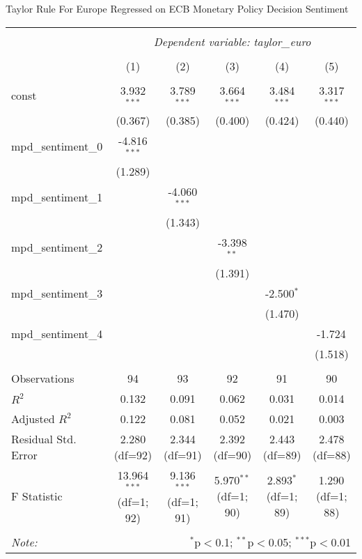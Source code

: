 \documentclass[12pt, letterpaper]{article}
\begin{document}
Taylor Rule For Europe Regressed on ECB Monetary Policy Decision Sentiment

\begin{table}[H]
\begin{adjustbox}{width=\textwidth}
\centering
\begin{tabular}{@{}lccccc@{}}
\\[-1.8ex]\hline
\hline \\[-1.8ex]
& \multicolumn{5}{c}{\textit{Dependent variable: taylor\_euro}} \\
\cline{2-6}
\\[-1.8ex] & (1) & (2) & (3) & (4) & (5) \\
\hline \\[-1.8ex]
const & 3.932$^{***}$ & 3.789$^{***}$ & 3.664$^{***}$ & 3.484$^{***}$ & 3.317$^{***}$ \\
& (0.367) & (0.385) & (0.400) & (0.424) & (0.440) \\
mpd\_sentiment\_0 & -4.816$^{***}$ & & & & \\
& (1.289) & & & & \\
mpd\_sentiment\_1 & & -4.060$^{***}$ & & & \\
& & (1.343) & & & \\
mpd\_sentiment\_2 & & & -3.398$^{**}$ & & \\
& & & (1.391) & & \\
mpd\_sentiment\_3 & & & & -2.500$^{*}$ & \\
& & & & (1.470) & \\
mpd\_sentiment\_4 & & & & & -1.724$^{}$ \\
& & & & & (1.518) \\
\hline \\[-1.8ex]
Observations & 94 & 93 & 92 & 91 & 90 \\
$R^2$ & 0.132 & 0.091 & 0.062 & 0.031 & 0.014 \\
Adjusted $R^2$ & 0.122 & 0.081 & 0.052 & 0.021 & 0.003 \\
Residual Std. Error & 2.280 (df=92) & 2.344 (df=91) & 2.392 (df=90) & 2.443 (df=89) & 2.478 (df=88) \\
F Statistic & 13.964$^{***}$ (df=1; 92) & 9.136$^{***}$ (df=1; 91) & 5.970$^{**}$ (df=1; 90) & 2.893$^{*}$ (df=1; 89) & 1.290$^{}$ (df=1; 88) \\
\hline
\hline \\[-1.8ex]
\textit{Note:} & \multicolumn{5}{r}{$^{*}$p$<$0.1; $^{**}$p$<$0.05; $^{***}$p$<$0.01} \\
\end{tabular}
\end{adjustbox}
\end{table}
\end{document}
